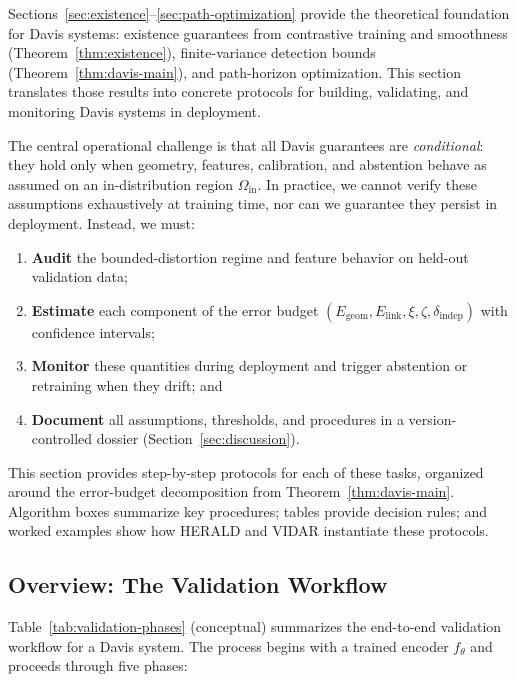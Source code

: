 \documentclass[11pt]{article}
\begin{document}
Sections~\ref{sec:existence}--\ref{sec:path-optimization} provide the theoretical foundation for Davis systems: existence guarantees from contrastive training and smoothness (Theorem~\ref{thm:existence}), finite-variance detection bounds (Theorem~\ref{thm:davis-main}), and path-horizon optimization. This section translates those results into concrete protocols for building, validating, and monitoring Davis systems in deployment.

The central operational challenge is that all Davis guarantees are \emph{conditional}: they hold only when geometry, features, calibration, and abstention behave as assumed on an in-distribution region $\Omega_{\mathrm{in}}$. In practice, we cannot verify these assumptions exhaustively at training time, nor can we guarantee they persist in deployment. Instead, we must:
\begin{enumerate}[label=(\roman*),leftmargin=*]
  \item \textbf{Audit} the bounded-distortion regime and feature behavior on held-out validation data;
  \item \textbf{Estimate} each component of the error budget $(E_{\mathrm{geom}}, E_{\mathrm{link}}, \xi, \zeta, \delta_{\mathrm{indep}})$ with confidence intervals;
  \item \textbf{Monitor} these quantities during deployment and trigger abstention or retraining when they drift; and
  \item \textbf{Document} all assumptions, thresholds, and procedures in a version-controlled dossier (Section~\ref{sec:discussion}).
\end{enumerate}

This section provides step-by-step protocols for each of these tasks, organized around the error-budget decomposition from Theorem~\ref{thm:davis-main}. Algorithm boxes summarize key procedures; tables provide decision rules; and worked examples show how HERALD and VIDAR instantiate these protocols.

\subsection{Overview: The Validation Workflow}
\label{subsec:ops-overview}

Table~\ref{tab:validation-phases} (conceptual) summarizes the end-to-end validation workflow for a Davis system. The process begins with a trained encoder $f_\theta$ and proceeds through five phases:
\end{document}
